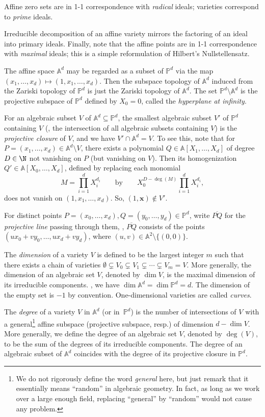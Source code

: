 \documentclass{toc}
\newcommand{\aff}{\mathbb{A}}
\newcommand{\proj}{\mathbb{P}}
\begin{document}
%
%
Affine zero sets are in 1-1 correspondence with \emph{radical} ideals;
varieties correspond to \emph{prime} ideals.

Irreducible decomposition of an affine variety mirrors the factoring of an ideal into primary ideals.  Finally, note that the affine points are in 1-1 correspondence with \emph{maximal} ideals; this is a simple reformulation of Hilbert's Nullstellensatz.


\smallskip
The affine space $\aff^d$ may be regarded as a subset of $\proj^d$ via the map $(x_1,\dots,x_d)\mapsto (1,x_1,\dots,x_d)$. 
Then the subspace topology of $\aff^d$ induced from the Zariski topology of $\proj^d$ is just the Zariski topology of $\aff^d$.
The set $\proj^d\setminus \aff^d$ is the projective subspace of $\proj^d$ defined by $X_0=0$, called the \emph{hyperplane at infinity}.
 
For an algebraic subset $V$ of $\aff^d\subseteq\proj^d$, the smallest algebraic subset $V'$ of $\proj^d$ containing $V$ (\ie, the intersection of all algebraic subsets containing $V$) is the \emph{projective closure} of $V$, and we have $V'\cap \aff^d=V$. To see this, note that for $P=(x_1,\dots,x_d)\in \aff^d\setminus V$, there exists a polynomial $Q\in\aff[X_1,\dots,X_d]$ of degree $D\in\N$ not vanishing on $P$ (but vanishing on $V$). Then its homogenization $Q'\in\aff[X_0,\dots,X_d]$, defined by replacing each monomial
\[
  M=\prod_{i=1}^d X_i^{d_i}\qquad\text{by}\qquad  X_0^{D-\deg(M)}\prod_{i=1}^d X_i^{d_i},
\]
does not vanish on $(1,x_1,\dots,x_d)$. So, $(1,\mathbf x)\notin V'$.

\smallskip
For distinct points $P=(x_0,\dots,x_d), Q=(y_0,\dots,y_d)\in\proj^d$, write $\overline{PQ}$ for the \emph{projective line} passing through them, \ie, $\overline{PQ}$ consists of the points $(ux_0+vy_0,\dots, ux_d+vy_d)$, where $(u,v)\in\aff^2\setminus\{(0,0)\}$. 

%
\begin{definition}  %
The \emph{dimension} of a variety $V$ is defined to be the largest integer $m$ such that there exists a chain of varieties $\emptyset\subsetneq V_0\subsetneq V_1\subsetneq\cdots\subsetneq V_m=V$. More generally, the dimension of an algebraic set $V$, denoted by $\dim V$, is the maximal dimension of its irreducible components. \Eg, we have $\dim\aff^d=\dim\proj^d=d$. 
The dimension of  the  empty set is $-1$ by convention.
%
One-dimensional    %
varieties are called \emph{curves}.

%
The \emph{degree} of a variety $V$ in $\aff^d$
%
(or in~$\proj^d$)   %
is the number of intersections of $V$ with a
%
general\footnote{We do not rigorously define the word \emph{general} here, but just remark that it essentially means ``random'' in algebraic geometry. In fact, as long as we work over a large enough field, replacing ``general'' by ``random'' would not cause any problem.} affine subspace
%
(projective subspace, resp.)  %
of dimension $d-\dim V$. 
More generally, we define the degree of an algebraic set $V$, denoted by $\deg(V)$,  to be the sum of the degrees of its irreducible components.
The degree of an algebraic subset of $\aff^d$ coincides with the degree of its projective closure in $\proj^d$.
\end{definition}
\end{document}
